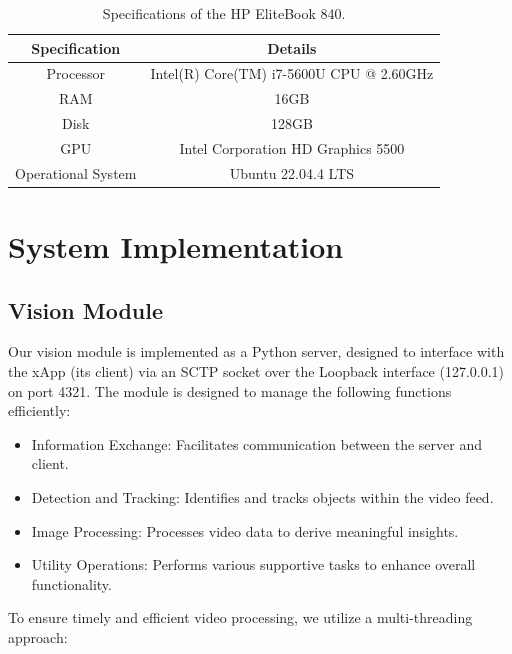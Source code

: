 \begin{table}[H]
    \caption{Specifications of the HP EliteBook 840.}
    \label{tab:specs_pc_ue}
    \begin{tabular}{|c|c|}
        \hline
        \textbf{Specification} & \textbf{Details} \\ \hline
        Processor                      &  Intel(R) Core(TM) i7-5600U CPU @ 2.60GHz          \\ \hline
        RAM                      &          16GB        \\ \hline
        Disk                      &   128GB         \\ \hline
        GPU                     &   Intel Corporation HD Graphics 5500                \\ \hline
        Operational System & Ubuntu 22.04.4 LTS                  \\ \hline  %
    \end{tabular}
\end{table}

\section{System Implementation}\label{sec:impl}

\subsection{Vision Module}\label{subsec:vision-module}
Our vision module is implemented as a Python server, designed to interface with the xApp (its client) via an SCTP socket over the Loopback interface (127.0.0.1) on port 4321.
The module is designed to manage the following functions efficiently:

\begin{itemize}
\item Information Exchange: Facilitates communication between the server and client.
\item Detection and Tracking: Identifies and tracks objects within the video feed.
\item Image Processing: Processes video data to derive meaningful insights.
\item Utility Operations: Performs various supportive tasks to enhance overall functionality.
\end{itemize}

To ensure timely and efficient video processing, we utilize a multi-threading approach:

